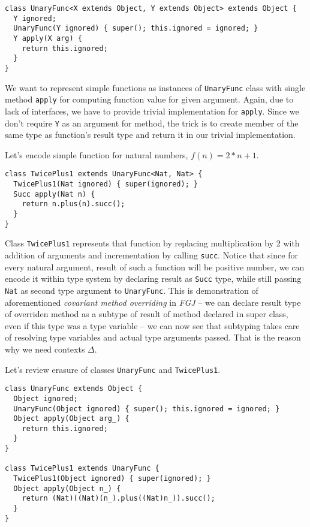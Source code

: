 \documentclass{article}[12pt]
\begin{document}
\begin{verbatim}
class UnaryFunc<X extends Object, Y extends Object> extends Object {
  Y ignored;
  UnaryFunc(Y ignored) { super(); this.ignored = ignored; }
  Y apply(X arg) {
    return this.ignored;
  }
}
\end{verbatim}

We want to represent simple functions as instances of
\texttt{UnaryFunc} class with single method \texttt{apply} for
computing function value for given argument. Again, due to lack
of interfaces, we have to provide trivial implementation for
\texttt{apply}. Since we don't require \texttt{Y} as an argument
for method, the trick is to create member of the same type as
function's result type and return it in our trivial implementation.

Let's encode simple function for natural numbers, $f(n) = 2 * n + 1$.

\begin{verbatim}
class TwicePlus1 extends UnaryFunc<Nat, Nat> {
  TwicePlus1(Nat ignored) { super(ignored); }
  Succ apply(Nat n) {
    return n.plus(n).succ();
  }
}
\end{verbatim}

Class \texttt{TwicePlus1} represents that function by replacing
multiplication by 2 with addition of arguments and incrementation
by calling \texttt{succ}. Notice that since for every natural argument,
result of such a function will be positive number, we can encode it
within type system by declaring result as \texttt{Succ} type, while
still passing \texttt{Nat} as second type argument to
\texttt{UnaryFunc}. This is demonstration of aforementioned
\emph{covariant method overriding} in \emph{FGJ} -- we can declare
result type of overriden method as a subtype of result of method
declared in super class, even if this type was a type variable --
we can now see that subtyping takes care of resolving type variables
and actual type arguments passed. That is the reason why we need
contexts $\Delta$.

Let's review erasure of classes \texttt{UnaryFunc} and
\texttt{TwicePlus1}.

\begin{verbatim}
class UnaryFunc extends Object {
  Object ignored;
  UnaryFunc(Object ignored) { super(); this.ignored = ignored; }
  Object apply(Object arg_) {
    return this.ignored;
  }
}

class TwicePlus1 extends UnaryFunc {
  TwicePlus1(Object ignored) { super(ignored); }
  Object apply(Object n_) {
    return (Nat)((Nat)(n_).plus((Nat)n_)).succ();
  }
}
\end{verbatim}
\end{document}
